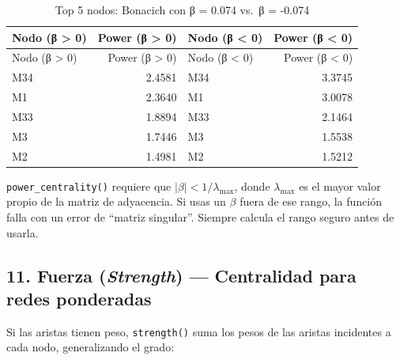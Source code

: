 \documentclass[
  letterpaper,
  DIV=11,
  numbers=noendperiod]{scrreprt}
\begin{document}
\begin{longtable}[]{@{}lrlr@{}}
\caption{Top 5 nodos: Bonacich con β = 0.074 vs.~β =
-0.074}\tabularnewline
\toprule\noalign{}
Nodo (β \textgreater{} 0) & Power (β \textgreater{} 0) & Nodo (β
\textless{} 0) & Power (β \textless{} 0) \\
\midrule\noalign{}
\endfirsthead
\toprule\noalign{}
Nodo (β \textgreater{} 0) & Power (β \textgreater{} 0) & Nodo (β
\textless{} 0) & Power (β \textless{} 0) \\
\midrule\noalign{}
\endhead
\bottomrule\noalign{}
\endlastfoot
M34 & 2.4581 & M34 & 3.3745 \\
M1 & 2.3640 & M1 & 3.0078 \\
M33 & 1.8894 & M33 & 2.1464 \\
M3 & 1.7446 & M3 & 1.5538 \\
M2 & 1.4981 & M2 & 1.5212 \\
\end{longtable}

\begin{tcolorbox}[enhanced jigsaw, toprule=.15mm, colframe=quarto-callout-warning-color-frame, coltitle=black, titlerule=0mm, colback=white, breakable, leftrule=.75mm, arc=.35mm, bottomtitle=1mm, toptitle=1mm, rightrule=.15mm, bottomrule=.15mm, left=2mm, title=\textcolor{quarto-callout-warning-color}{\faExclamationTriangle}\hspace{0.5em}{⚠️ Error frecuente}, colbacktitle=quarto-callout-warning-color!10!white, opacityback=0, opacitybacktitle=0.6]

\texttt{power\_centrality()} requiere que
\(|\beta| < 1/\lambda_{\max}\), donde \(\lambda_{\max}\) es el mayor
valor propio de la matriz de adyacencia. Si usas un \(\beta\) fuera de
ese rango, la función falla con un error de ``matriz singular''. Siempre
calcula el rango seguro antes de usarla.

\end{tcolorbox}

\subsection{\texorpdfstring{11. Fuerza (\emph{Strength}) --- Centralidad
para redes
ponderadas}{11. Fuerza (Strength) --- Centralidad para redes ponderadas}}\label{fuerza-strength-centralidad-para-redes-ponderadas}

Si las aristas tienen peso, \texttt{strength()} suma los pesos de las
aristas incidentes a cada nodo, generalizando el grado:
\end{document}
